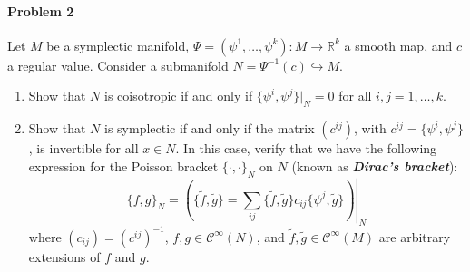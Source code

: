 \paragraph{Problem 2} Let $M$ be a symplectic manifold, $\Psi=(\psi^1,\ldots,\psi^k):M\to \mathbb{R}^{k}$ a smooth map, and $c$ a regular value. Consider a submanifold $N=\Psi^{-1}(c)\hookrightarrow M$.
\begin{enumerate}[label=\alph*.]
	\item Show that $N$ is coisotropic if and only if $\{\psi^i,\psi^j\}|_{N}=0$ for all $i,j=1,\ldots,k$.
	
	\item Show that $N$ is symplectic if and only if the matrix $(c^{ij})$, with $c^{ij}=\{\psi^i,\psi^j\}$, is invertible for all $x\in N$. In this case, verify that we have the following expression for the Poisson bracket $\{\cdot,\cdot\}_N$ on $N$ (known as \textit{\textbf{Dirac's bracket}}):
	\[\{f,g\}_N=\left.\left(\{\tilde{f},\tilde{g}\} =\sum_{ij}\{\tilde{f},\tilde{g}\} c_{ij}\{\psi^j,\tilde{g}\}\right)\right|_{N}\]
		where $(c_{ij})=(c^{ij })^{-1}$, $f,g\in \mathcal{C}^\infty(N)$, and $\tilde{f},\tilde{g}\in\mathcal{C}^\infty(M)$ are arbitrary extensions of $f$ and $g$.
\end{enumerate}

